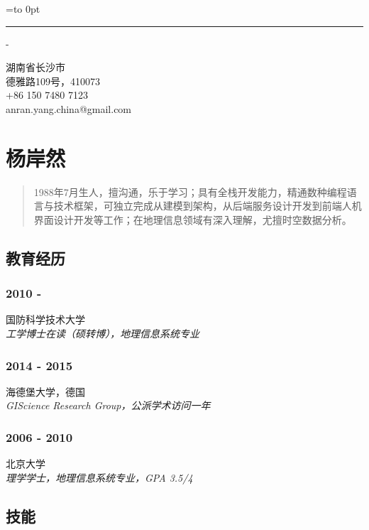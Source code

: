 \documentclass[12pt,]{article}
\date{}
\newenvironment{nospace}
  {\par\edef\theprevdepth{\the\prevdepth}\nointerlineskip
   \setbox\zerobox=\vtop to 0pt\bgroup
   \hrule height0pt\kern\dimexpr\baselineskip-\topskip\relax
  }
  {\par\vss\egroup\ht\zerobox=0pt \wd\zerobox=0pt \dp\zerobox=0pt
   \box\zerobox}
\begin{document}
\begin{nospace}\begin{flushright}
\vspace{-2em}湖南省长沙市\\
德雅路109号，410073\\
+86 150 7480 7123\\
anran.yang.china@gmail.com
\end{flushright}\end{nospace}

\section{杨岸然}\label{ux6768ux5cb8ux7136}

\begin{quote}
1988年7月生人，擅沟通，乐于学习；具有全栈开发能力，精通数种编程语言与技术框架，可独立完成从建模到架构，从后端服务设计开发到前端人机界面设计开发等工作；在地理信息领域有深入理解，尤擅时空数据分析。
\end{quote}

\subsection{教育经历}\label{ux6559ux80b2ux7ecfux5386}

\subsubsection{2010 -}\label{section}

国防科学技术大学\\
\emph{工学博士在读（硕转博），地理信息系统专业}

\subsubsection{2014 - 2015}\label{section-1}

海德堡大学，德国\\
\emph{GIScience Research Group，公派学术访问一年}

\subsubsection{2006 - 2010}\label{section-2}

北京大学\\
\emph{理学学士，地理信息系统专业，GPA 3.5/4}

\subsection{技能}\label{ux6280ux80fd}
\end{document}
